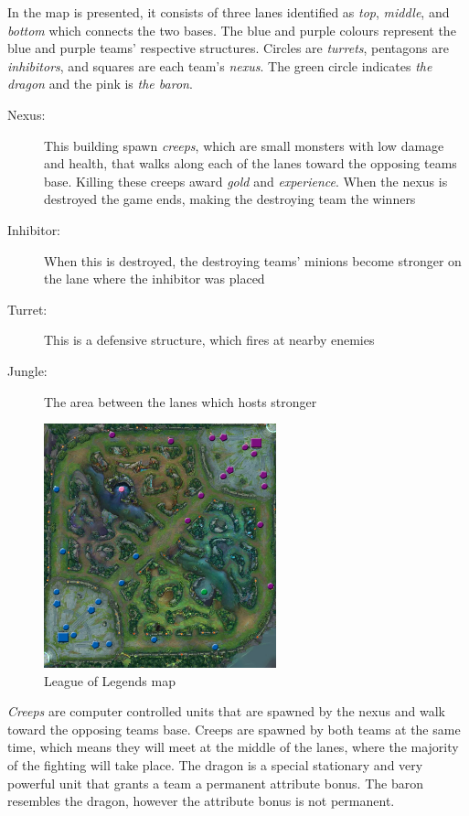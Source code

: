 In  the map is presented, it consists of three lanes identified as \emph{top}, \emph{middle}, and \emph{bottom} which connects the two bases. The blue and purple colours represent the blue and purple teams' respective structures. Circles are \emph{turrets}, pentagons are \emph{inhibitors}, and squares are each team's \emph{nexus}. The green circle indicates \emph{the dragon} and the pink is \emph{the baron}.

\begin{description}
\item[Nexus:] This building spawn \emph{creeps}, which are small monsters with low damage and health, that walks along each of the lanes toward the opposing teams base. Killing these creeps award \emph{gold} and \emph{experience}. When the nexus is destroyed the game ends, making the destroying team the winners
\item[Inhibitor:] When this is destroyed, the destroying teams' minions become stronger on the lane where the inhibitor was placed
\item[Turret:] This is a defensive structure, which fires at nearby enemies
\item[Jungle:] The area between the lanes which hosts stronger
\end{description}

\begin{figure}[!htb]
  \centering
    \includegraphics[width=0.6\textwidth]{img/lolmap.jpg}
  \caption{League of Legends map~\cite{lolmap}}\label{fig:lolmap}
\end{figure}

\emph{Creeps} are computer controlled units that are spawned by the nexus and walk toward the opposing teams base. Creeps are spawned by both teams at the same time, which means they will meet at the middle of the lanes, where the majority of the fighting will take place. The dragon is a special stationary and very powerful unit that grants a team a permanent attribute bonus. The baron resembles the dragon, however the attribute bonus is not permanent.

